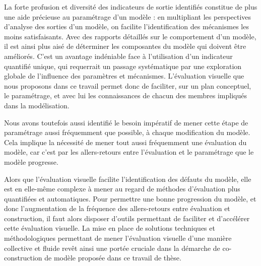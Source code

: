 La forte profusion et diversité des indicateurs de sortie identifiés constitue de plus une aide précieuse au paramétrage d'un modèle : en multipliant les perspectives d'analyse des sorties d'un modèle, on facilite l'identification des mécanismes les moins satisfaisants.
Avec des rapports détaillés sur le comportement d'un modèle, il est ainsi plus aisé de déterminer les composantes du modèle qui doivent être améliorés.
C'est un avantage indéniable face à l'utilisation d'un indicateur quantifié unique, qui requerrait un passage systématique par une exploration globale de l'influence des paramètres et mécanismes.
L'évaluation visuelle que nous proposons dans ce travail permet donc de faciliter, sur un plan conceptuel, le paramétrage, et avec lui les connaissances de chacun des membres impliqués dans la modélisation.

Nous avons toutefois aussi identifié le besoin impératif de mener cette étape de paramétrage aussi fréquemment que possible, à chaque modification du modèle.
Cela implique la nécessité de mener tout aussi fréquemment une évaluation du modèle, car c'est par les allers-retours entre l'évaluation et le paramétrage que le modèle progresse.

Alors que l'évaluation visuelle facilite l'identification des défauts du modèle, elle est en elle-même complexe à mener au regard de méthodes d'évaluation plus quantifiées et automatiques.
Pour permettre une bonne progression du modèle, et donc l'augmentation de la  fréquence des allers-retours entre évaluation et construction, il faut alors disposer d'outils permettant de faciliter et d'accélérer cette évaluation visuelle.
La mise en place de solutions techniques et méthodologiques permettant de mener l'évaluation visuelle d'une manière collective et fluide revêt ainsi une portée cruciale dans la démarche de co-construction de modèle proposée dans ce travail de thèse.
